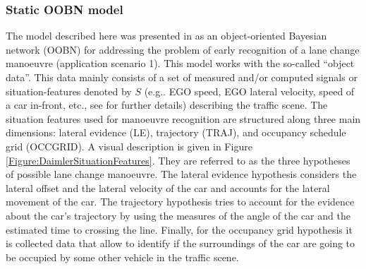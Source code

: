 \subsubsection*{Static OOBN model}

The model described here was presented in \cite{kasper2012object} as an object-oriented Bayesian network  (OOBN) \cite{koller1997object} for addressing the problem of early recognition of a lane change manoeuvre (application scenario 1).  This model works with the so-called ``object data''. This data mainly consists of a set of measured and/or computed signals or situation-features denoted by $S$ (e.g.. EGO speed, EGO lateral velocity, speed of a car in-front, etc., see \cite{kasper2012object} for further details) describing the traffic scene. The situation features used for manoeuvre recognition are structured along three main dimensions: lateral evidence (LE), trajectory (TRAJ), and occupancy schedule grid (OCCGRID).  A visual description is given in Figure \ref{Figure:DaimlerSituationFeatures}. They are referred to as the three hypotheses of possible lane change manoeuvre. The lateral evidence hypothesis considers the lateral offset and the lateral velocity of the car and accounts for the lateral movement of the car. The trajectory hypothesis tries to account for the evidence about the car's trajectory by using the measures of the angle of the car and the estimated time to crossing the line. Finally, for the occupancy grid hypothesis it is collected data that allow to identify if the surroundings of the car are going to be occupied by some other vehicle in the traffic scene. 

